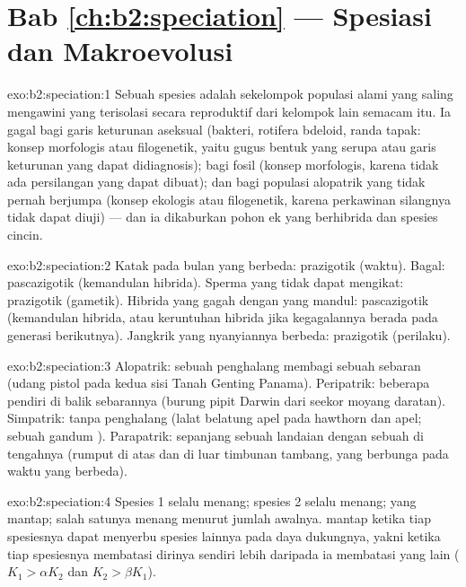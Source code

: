 \section*{Bab \ref{ch:b2:speciation} --- Spesiasi dan Makroevolusi}

\begin{solution}{exo:b2:speciation:1}
Sebuah spesies adalah sekelompok populasi alami yang saling mengawini
yang terisolasi secara reproduktif dari kelompok lain semacam itu. Ia
gagal bagi garis keturunan aseksual (bakteri, rotifera bdeloid,
randa tapak: konsep morfologis atau filogenetik, yaitu gugus bentuk
yang serupa atau garis keturunan yang dapat didiagnosis); bagi fosil
(konsep morfologis, karena tidak ada persilangan yang dapat dibuat);
dan bagi populasi alopatrik yang tidak pernah berjumpa (konsep ekologis
atau filogenetik, karena perkawinan silangnya tidak dapat diuji) ---
dan ia dikaburkan pohon ek yang berhibrida dan spesies cincin.
\end{solution}

\begin{solution}{exo:b2:speciation:2}
Katak pada bulan yang berbeda: prazigotik (waktu). Bagal: pascazigotik
(kemandulan hibrida). Sperma yang tidak dapat mengikat: prazigotik
(gametik). Hibrida yang gagah dengan  yang mandul: pascazigotik
(kemandulan hibrida, atau keruntuhan hibrida jika kegagalannya berada
pada generasi berikutnya). Jangkrik yang nyanyiannya berbeda:
prazigotik (perilaku).
\end{solution}

\begin{solution}{exo:b2:speciation:3}
Alopatrik: sebuah penghalang membagi sebuah sebaran (udang pistol pada
kedua sisi Tanah Genting Panama). Peripatrik: beberapa pendiri di balik
sebarannya (burung pipit Darwin dari seekor moyang daratan). Simpatrik:
tanpa penghalang (lalat belatung apel pada hawthorn dan apel; sebuah
gandum ). Parapatrik: sepanjang sebuah landaian dengan
sebuah  di tengahnya (rumput di atas dan di luar timbunan
tambang, yang berbunga pada waktu yang berbeda).
\end{solution}

\begin{solution}{exo:b2:speciation:4}
Spesies 1 selalu menang; spesies 2 selalu menang; 
yang mantap; salah satunya menang menurut jumlah awalnya.  mantap ketika tiap spesiesnya dapat menyerbu spesies
lainnya pada daya dukungnya, yakni ketika tiap spesiesnya membatasi
dirinya sendiri lebih daripada ia membatasi yang lain ($K_1 > \alpha K_2$ dan $K_2 > \beta K_1$).
\end{solution}

